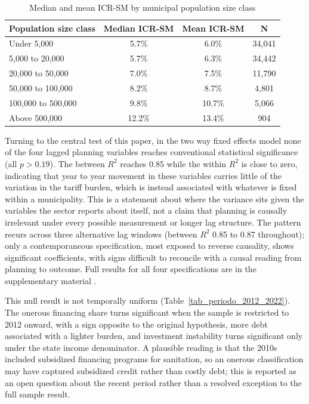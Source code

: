\documentclass[preprint,12pt]{elsarticle}
\begin{document}
\begin{table}[h]
\caption{Median and mean ICR-SM by municipal population size class}\label{tab_icr_porte}
\centering
\begin{tabular}{@{}lccc@{}}
\toprule
Population size class & Median ICR-SM & Mean ICR-SM & N \\
\midrule
Under 5,000            & 5.7\% & 6.0\%  & 34,041 \\
5,000 to 20,000        & 5.7\% & 6.3\%  & 34,442 \\
20,000 to 50,000       & 7.0\% & 7.5\%  & 11,790 \\
50,000 to 100,000      & 8.2\% & 8.7\%  & 4,801 \\
100,000 to 500,000     & 9.8\% & 10.7\% & 5,066 \\
Above 500,000          & 12.2\% & 13.4\% & 904 \\
\bottomrule
\end{tabular}
\end{table}

Turning to the central test of this paper, in the two way fixed effects model none of the four lagged planning variables reaches conventional statistical significance (all $p>0.19$). The between $R^2$ reaches 0.85 while the within $R^2$ is close to zero, indicating that year to year movement in these variables carries little of the variation in the tariff burden, which is instead associated with whatever is fixed within a municipality. This is a statement about where the variance sits given the variables the sector reports about itself, not a claim that planning is causally irrelevant under every possible measurement or longer lag structure. The pattern recurs across three alternative lag windows (between $R^2$ 0.85 to 0.87 throughout); only a contemporaneous specification, most exposed to reverse causality, shows significant coefficients, with signs difficult to reconcile with a causal reading from planning to outcome. Full results for all four specifications are in the supplementary material \citep{Figueredo2026Repo}.

This null result is not temporally uniform (Table~\ref{tab_periodo_2012_2022}). The onerous financing share turns significant when the sample is restricted to 2012 onward, with a sign opposite to the original hypothesis, more debt associated with a lighter burden, and investment instability turns significant only under the state income denominator. A plausible reading is that the 2010s included subsidized financing programs for sanitation, so an onerous classification may have captured subsidized credit rather than costly debt; this is reported as an open question about the recent period rather than a resolved exception to the full sample result.
\end{document}
